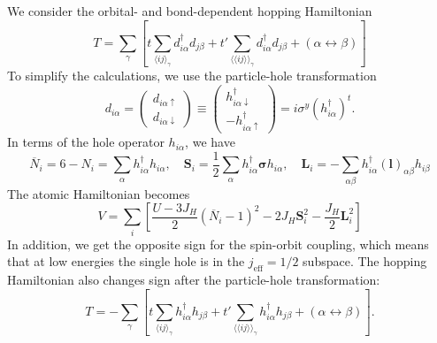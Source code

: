 \documentclass[11pt, a4paper]{article}
\begin{document}
We consider the orbital- and bond-dependent hopping Hamiltonian
\begin{equation}
T = \sum_{\gamma} \left[ t \sum_{\langle ij \rangle_{\gamma}} d_{i\alpha}^{\dagger} d_{j\beta} + t' \sum_{\langle\langle ij \rangle\rangle_{\gamma}} d_{i\alpha}^{\dagger} d_{j\beta} + (\alpha \leftrightarrow \beta) \right]
\end{equation}
To simplify the calculations, we use the particle-hole transformation
\begin{equation}
d_{i\alpha} = \begin{pmatrix} d_{i\alpha\uparrow} \\ d_{i\alpha\downarrow} \end{pmatrix} \equiv \begin{pmatrix} h_{i\alpha\downarrow}^{\dagger} \\ -h_{i\alpha\uparrow}^{\dagger} \end{pmatrix} = i\sigma^y (h_{i\alpha}^{\dagger})^t.
\end{equation}
In terms of the hole operator $h_{i\alpha}$, we have
\begin{equation}
\overline{N}_i = 6 - N_i = \sum_{\alpha} h_{i\alpha}^{\dagger} h_{i\alpha}, \quad \bm{S}_i = \frac{1}{2} \sum_{\alpha} h_{i\alpha}^{\dagger} \bm{\sigma} h_{i\alpha}, \quad \bm{L}_i = -\sum_{\alpha\beta} h_{i\alpha}^{\dagger} (\bm{l})_{\alpha\beta} h_{i\beta}
\end{equation}
The atomic Hamiltonian becomes
\begin{equation}
V = \sum_i \left[ \frac{U-3J_H}{2}(\overline{N}_i-1)^2 - 2J_H \bm{S}_i^2 - \frac{J_H}{2}\bm{L}_i^2 \right]
\end{equation}
In addition, we get the opposite sign for the spin-orbit coupling, which means that at low energies the single hole is in the $j_{\text{eff}}=1/2$ subspace. The hopping Hamiltonian also changes sign after the particle-hole transformation:
\begin{equation}
T = -\sum_{\gamma} \left[ t \sum_{\langle ij \rangle_{\gamma}} h_{i\alpha}^{\dagger} h_{j\beta} + t' \sum_{\langle\langle ij \rangle\rangle_{\gamma}} h_{i\alpha}^{\dagger} h_{j\beta} + (\alpha \leftrightarrow \beta) \right].
\end{equation}
\end{document}
